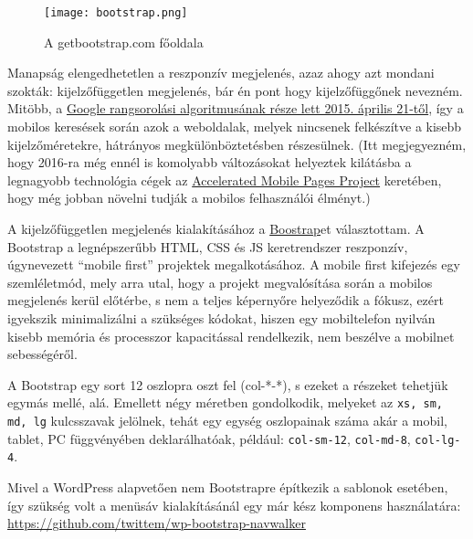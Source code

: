 \newpage


\begin{figure}
	\texttt{[image: bootstrap.png]}
	\caption{A getbootstrap.com főoldala}
\end{figure}

Manapság elengedhetetlen a reszponzív megjelenés, azaz ahogy azt mondani szokták: kijelzőfüggetlen megjelenés, bár én pont hogy kijelzőfüggőnek nevezném. Mitöbb, a \href{https://webmasters.googleblog.com/2015/02/finding-more-mobile-friendly-search.html}{Google rangsorolási algoritmusának része lett 2015. április 21-től}, így a mobilos keresések során azok a weboldalak, melyek nincsenek felkészítve a kisebb kijelzőméretekre, hátrányos megkülönböztetésben részesülnek. (Itt megjegyezném, hogy 2016-ra még ennél is komolyabb változásokat helyeztek kilátásba a legnagyobb technológia cégek az \href{https://www.ampproject.org/}{Accelerated Mobile Pages Project} keretében, hogy még jobban növelni tudják a mobilos felhasználói élményt.)

A kijelzőfüggetlen megjelenés kialakításához a \href{http://getbootstrap.com/}{Boostrap}et választottam. A Bootstrap a legnépszerűbb HTML, CSS és JS keretrendszer reszponzív, úgynevezett ``mobile first'' projektek megalkotásához. A mobile first kifejezés egy szemléletmód, mely arra utal, hogy a projekt megvalósítása során a mobilos megjelenés kerül előtérbe, s nem a teljes képernyőre helyeződik a fókusz, ezért igyekszik minimalizálni a szükséges kódokat, hiszen egy mobiltelefon nyilván kisebb memória és processzor kapacitással rendelkezik, nem beszélve a mobilnet sebességéről.

A Bootstrap egy sort 12 oszlopra oszt fel (col-*-*), s ezeket a részeket tehetjük egymás mellé, alá. Emellett négy méretben gondolkodik, melyeket az \verb|xs, sm, md, lg| kulcsszavak jelölnek, tehát egy egység oszlopainak száma akár a mobil, tablet, PC függvényében deklarálhatóak, például: \texttt{col-sm-12}, \texttt{col-md-8}, \texttt{col-lg-4}.

Mivel a WordPress alapvetően nem Bootstrapre építkezik a sablonok esetében, így szükség volt a menüsáv kialakításánál egy már kész komponens használatára: \url{https://github.com/twittem/wp-bootstrap-navwalker}

\newpage



